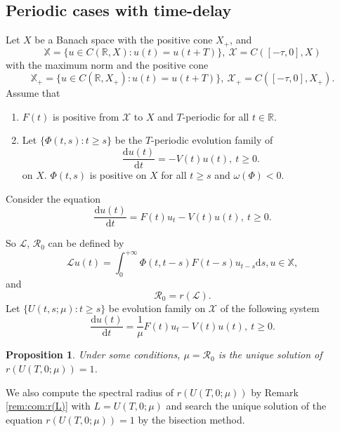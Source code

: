 \documentclass[12pt,reqno]{article}
\newtheorem{proposition}[theorem]{Proposition}
\newcommand{\D}{\mathrm{d}}
\newcommand{\Real}{\mathbb{R}}
\newcommand{\cL}{\mathcal{L}}
\newcommand{\cX}{\mathcal{X}}
\newcommand{\bX}{\mathbb{X}}
\newcommand{\R}{\mathcal{R}_0}
\begin{document}
\subsection{Periodic cases with time-delay}
 Let $X$ be a Banach space with the positive cone $X_+$, and
 $$
 \bX = \{ u \in C(\Real,X): u (t)= u(t+T)\}
 ,~
 \cX = C([-\tau,0],X)
 $$
 with the maximum norm and the positive cone
 $$
 \bX_+ = \{ u \in C(\Real,X_+): u (t)= u(t+T)\}
 ,~
 \cX_+ = C([-\tau,0],X_+).
 $$
 Assume that
 \begin{enumerate}[(H1)]
 	\item $F(t)$ is positive from $\cX$ to $X$ and $T$-periodic for all $t \in \Real$.
 	\item Let $\{ \Phi(t,s): t \geq s \} $ be the $T$-periodic evolution family of
 	\begin{equation}\label{equ:periodic:internal:delay}
 	\frac{\D u(t)}{\D t} = - V(t) u(t),~ t\geq 0.
 	\end{equation}
 	on $X$.	$\Phi(t,s)$ is positive on $X$ for all $t \geq s$  and $\omega(\Phi)<0$.
 \end{enumerate}
 Consider the equation
 \begin{equation}\label{equ:periodic:delay}
 \frac{\D u(t)}{\D t} = F(t) u_t - V(t) u(t),~ t\geq 0.
 \end{equation}


 So $\cL$, $\R$ can be defined by
 \begin{equation}
 \cL u (t) = \int_{0}^{+\infty} \Phi(t,t-s) F(t-s) u_{t-s} \D s, u \in \bX,
 \end{equation}
 and
 $$
\R= r(\cL).
 $$
 Let $\{ U(t,s;\mu): t\geq s \}$ be evolution family on $\cX$ of the following system
 \begin{equation}\label{equ:periodic:mu:delay}
 \frac{\D u(t)}{\D t} = \frac{1}{\mu} F(t) u_t - V(t) u(t),~ t\geq 0.
 \end{equation}
 \begin{proposition}\label{prop:th:solution:delay}
 	Under some conditions, $\mu = \R$ is the unique solution of $r(U(T,0;\mu))=1$.
 \end{proposition}
 We also compute the spectral radius of $r(U(T,0;\mu))$ by Remark \ref{rem:com:r(L)} with $L= U(T,0;\mu)$ and search the unique solution of the equation $r(U(T,0;\mu))=1$ by the bisection method.
\end{document}
